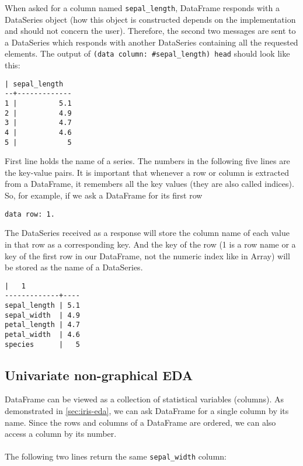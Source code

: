 \documentclass[sigplan]{acmart}
\begin{document}
When asked for a column named \texttt{sepal\_length}, DataFrame responds with a DataSeries object (how this object is constructed depends on the implementation and should not concern the user). Therefore, the second two messages are sent to a DataSeries which responds with another DataSeries containing all the requested elements.
The output of \texttt{(data column: \#sepal\_length) head} should look like this:

\begin{lstlisting}[basicstyle=\small]
  | sepal_length
--+-------------
1 |          5.1
2 |          4.9
3 |          4.7
4 |          4.6
5 |            5
\end{lstlisting}

First line holds the name of a series. The numbers in the following five lines are the key-value pairs. It is important that whenever a row or column is extracted from a DataFrame, it remembers all the key values (they are also called indices). So, for example, if we ask a DataFrame for its first row

\begin{lstlisting}[basicstyle=\small,language=Smalltalk]
data row: 1.
\end{lstlisting}

The DataSeries received as a response will store the column name of each value in that row as a corresponding key. And the key of the row (1 is a row name or a key of the first row in our DataFrame, not the numeric index like in Array) will be stored as the name of a DataSeries.

\begin{lstlisting}[basicstyle=\small]
             |   1
-------------+----        
sepal_length | 5.1
sepal_width  | 4.9
petal_length | 4.7 
petal_width  | 4.6
species      |   5 
\end{lstlisting}

\subsection{Univariate non-graphical EDA}
\label{sec:uni-non}

DataFrame can be viewed as a collection of statistical variables (columns). As demonstrated in \ref{sec:iris-eda}, we can ask DataFrame for a single column by its name. Since the rows and columns of a DataFrame are ordered, we can also access a column by its number.

\paragraph{}The following two lines return the same \texttt{sepal\_width} column:
\end{document}
